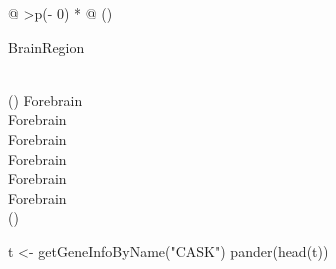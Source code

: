 \documentclass[
]{article}
\newenvironment{Shaded}{\begin{snugshade}}{\end{snugshade}}
\newcommand{\FunctionTok}[1]{\textcolor[rgb]{0.00,0.00,0.00}{#1}}
\newcommand{\NormalTok}[1]{#1}
\newcommand{\OtherTok}[1]{\textcolor[rgb]{0.56,0.35,0.01}{#1}}
\newcommand{\StringTok}[1]{\textcolor[rgb]{0.31,0.60,0.02}{#1}}
\begin{document}
\begin{longtable}[]{@{}
  >{\centering\arraybackslash}p{(\columnwidth - 0\tabcolsep) * }@{}}
\toprule()
\begin{minipage}[b]{\linewidth}\centering
BrainRegion
\end{minipage} \\
\midrule()
\endhead
Forebrain \\
Forebrain \\
Forebrain \\
Forebrain \\
Forebrain \\
Forebrain \\
\bottomrule()
\end{longtable}

\begin{Shaded}
\begin{Highlighting}[]

\NormalTok{t }\OtherTok{\textless{}{-}} \FunctionTok{getGeneInfoByName}\NormalTok{(}\StringTok{"CASK"}\NormalTok{)}
\FunctionTok{pander}\NormalTok{(}\FunctionTok{head}\NormalTok{(t))}
\end{Highlighting}
\end{Shaded}
\end{document}
